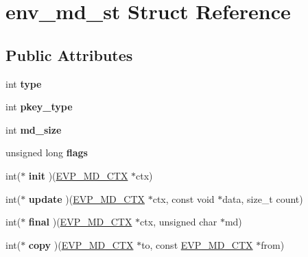 \hypertarget{structenv__md__st}{}\section{env\+\_\+md\+\_\+st Struct Reference}
\label{structenv__md__st}
\subsection*{Public Attributes}
\begin{DoxyCompactItemize}
\item 
\mbox{\label{structenv__md__st_a23f72d7bf1652d69a85942f66f55df01}} 
int {\bfseries type}
\item 
\mbox{\label{structenv__md__st_a30d9b3466b50542b6931476f0ecf2351}} 
int {\bfseries pkey\+\_\+type}
\item 
\mbox{\label{structenv__md__st_a7de9719a79492ba980f18f546ff160cf}} 
int {\bfseries md\+\_\+size}
\item 
\mbox{\label{structenv__md__st_a5096c8e255bb2b2100aeae4d50af2fcb}} 
unsigned long {\bfseries flags}
\item 
\mbox{\label{structenv__md__st_afe1f83efe755ab7f5887ff46aa1269be}} 
int($\ast$ {\bfseries init} )(\hyperlink{structenv__md__ctx__st}{E\+V\+P\+\_\+\+M\+D\+\_\+\+C\+TX} $\ast$ctx)
\item 
\mbox{\label{structenv__md__st_a57339bd5446e71a0a827f12d8ba23e40}} 
int($\ast$ {\bfseries update} )(\hyperlink{structenv__md__ctx__st}{E\+V\+P\+\_\+\+M\+D\+\_\+\+C\+TX} $\ast$ctx, const void $\ast$data, size\+\_\+t count)
\item 
\mbox{\label{structenv__md__st_aa04a65c96264e232f926f2ddf03a5fd3}} 
int($\ast$ {\bfseries final} )(\hyperlink{structenv__md__ctx__st}{E\+V\+P\+\_\+\+M\+D\+\_\+\+C\+TX} $\ast$ctx, unsigned char $\ast$md)
\item 
\mbox{\label{structenv__md__st_ac616c2dbbb6a5b70cca668db44500840}} 
int($\ast$ {\bfseries copy} )(\hyperlink{structenv__md__ctx__st}{E\+V\+P\+\_\+\+M\+D\+\_\+\+C\+TX} $\ast$to, const \hyperlink{structenv__md__ctx__st}{E\+V\+P\+\_\+\+M\+D\+\_\+\+C\+TX} $\ast$from)

\end{DoxyCompactItemize}
